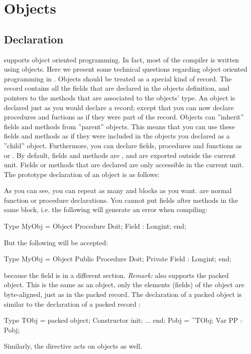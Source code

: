 \documentclass{report}
\begin{document}
\chapter{Objects}
\section{Declaration}
\fpc supports object oriented programming. In fact, most  of the compiler is
written using objects. Here we present some technical questions regarding
object oriented programming in \fpc.
Objects should be treated as a special kind of record. The record contains 
all the fields that are declared in the objects definition, and pointers 
to the methods that are associated to the objects' type.
An object is declared just as you would declare a record; except that you
can now declare procedures and fuctions as if they were part of the record.
Objects can ''inherit'' fields and methods from ''parent'' objects. This means
that you can use these fields and methods as if they were included in the
objects you declared as a ''child'' object. 
Furthermore, you can declare fields, procedures and functions as 
or . By default, fields and methods are , and are
exported outside the current unit. Fields or methods that are declared
 are only accessible in the current unit.
The prototype declaration of an object is as follows:

As you can see, you can repeat as many  and  
blocks as you want.
 are normal function or procedure declarations. 
You cannot put fields after methods in the same block, i.e. the following 
will generate an error when compiling:
\begin{listing}
Type MyObj = Object
       Procedure Doit;
       Field : Longint;
     end; 
\end{listing}
But the following will be accepted:
\begin{listing}
Type MyObj = Object
      Public
       Procedure Doit;
      Private
       Field : Longint;
     end; 
\end{listing}
because the field is in a different section.
{\em Remark:}
\fpc also supports the packed object. This is the same as an object, only 
the elements (fields) of the object are byte-aligned, just as in the packed
record.
The declaration of a packed object is similar to the declaration
of a packed record :
\begin{listing}
Type
  TObj = packed object;
   Constructor init;
   ...
   end;
  Pobj = ^TObj;
Var PP : Pobj;
\end{listing}
Similarly, the  directive acts on objects as well.
\end{document}
